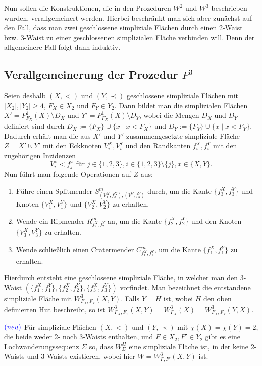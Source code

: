 \documentclass[12pt,titlepage]{article}
\begin{document}
Nun sollen die Konstruktionen, die in den Prozeduren $W^2$ und $W^3$ beschrieben wurden, verallgemeinert werden. Hierbei beschränkt man sich aber zunächst auf den Fall, dass man zwei geschlossene simpliziale Flächen durch einen 2-Waist bzw. 3-Waist zu einer geschlossenen simplizialen Fläche verbinden will. Denn der allgemeinere Fall folgt dann induktiv.
\subsection{Verallgemeinerung der Prozedur $P^3$}
Seien deshalb $(X,<)$ und $(Y,\prec)$ geschlossene simpliziale Flächen mit $ \vert X_2\vert , \vert Y_2\vert \geq 4$, $F_X \in X_2$ und $F_Y \in Y_2$. Dann bildet man die simplizialen Flächen $X'=P^1_{F_X}(X)\setminus D_X$ und $Y'=P^1_{F_X}(X)\setminus D_{Y}$, wobei die Mengen $D_X$ und $D_Y$ definiert sind durch
$D_X:=\{F_X\} \cup \{x \mid x <F_X\}$ und
$D_Y:=\{F_Y\} \cup \{x \mid x<F_Y\}$.
Dadurch erhält man die aus $X'$ und $Y'$ zusammengesetzte simpliziale Fläche $Z=X' \uplus Y'$ mit den Eckknoten $V_i^{X},V_i^{Y}$ und den Randkanten $f_i^{X},f_i^{Y}$ mit den zugehörigen Inzidenzen 
\[
V^x_i < f^x_j \text{ für } j\in \{1,2,3\},i\in\{1,2,3\}\setminus \{j\}, x\in \{X,Y\}.
\]
Nun führt man folgende Operationen auf $Z$ aus:
\begin{enumerate}
\item Führe einen Splitmender $S^m_{(V_1^X,f_3^X),(V_1^Y,f_3^Y)}$ durch, um die Kante $\{f_3^X,f_3^Y\}$ und Knoten $\{V_1^X,V_1^Y\}$ und $\{V_2^X,V_2^Y\}$ zu erhalten.
\item Wende ein Ripmender $R^m_{f_2^X, f_2^Y}$ an, um die Kante $\{f_2^X ,f_2^Y\}$ und den Knoten $\{V_3^X,V_3^Y\}$ zu erhalten. 
\item Wende schließlich einen Cratermender $C^m_{f_1^X,f_1^Y}$, um die Kante $\{f_1^X,f_1^Y\}$ zu erhalten.
\end{enumerate}
Hierdurch entsteht eine geschlossene simpliziale Fläche, in welcher man den 3-Waist $(\{f_1^X,f_1^Y\},\{f_2^X,f_2^Y\},\{f_3^X,f_3^Y\})$ vorfindet. Man bezeichnet die entstandene simpliziale Fläche mit $W^3_{F_X,F_Y}(X,Y)$. Falls $Y=H$ ist, wobei $H$ den oben definierten Hut beschreibt, so ist $W^3_{F_X,F_Y}(X,Y)=W^3_{F_X}(X)=W^3_{F_X,F_Y}(Y,X)$.
\begin{folgerung} $\textcolor{blue}{(neu)}$
Für simpliziale Flächen $(X,<)$ und $(Y, \prec)$ mit $\chi (X)= \chi (Y) =2$, die beide weder 2- noch 3-Waists enthalten, und $F\in X_2 ,F' \in Y_2$ gibt es eine Lochwanderungssequenz $ \Sigma$ so, dass $W^H_{\Sigma}$ eine simpliziale Fläche ist, in der keine 2-Waists und 3-Waists existieren, wobei hier $W=W^3_{F,F'}(X,Y)$ ist. 
\end{folgerung} 
 
\end{document}
